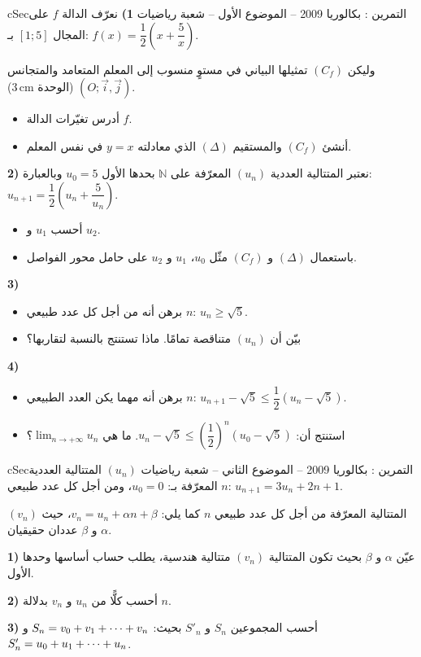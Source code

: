 \documentclass[12pt,a4paper]{article}
\newenvironment{BOX}[2]{\begin{otherlanguage}{english}\begin{arbox}{#1}{#2}}{\end{arbox}\end{otherlanguage}}
\newcounter{exo}
\newenvironment{tamrin}[1]{\stepcounter{exo}\begin{BOX}{cSec}{التمرين \theexo: #1}}{\end{BOX}}
\renewcommand{\cdots}{\mathinner{\cdotp\cdotp\cdotp}}
\newcommand{\N}{\mathbb{N}}
\newcommand{\limn}{\displaystyle\lim_{n\to+\infty}}
\newenvironment{sq}{\begin{itemize}[leftmargin=2.4em,itemsep=3pt]}{\end{itemize}}
\newcommand{\qa}{\item[(أ)]}\newcommand{\qb}{\item[(ب)]}\newcommand{\qc}{\item[(جـ)]}\newcommand{\qd}{\item[(د)]}\newcommand{\qe}{\item[(هـ)]}
\begin{document}
\begin{tamrin}{بكالوريا 2009 -- الموضوع الأول -- شعبة رياضيات}
\textbf{1)} نعرّف الدالة $f$ على المجال $[1;5]$ بـ: $f(x)=\dfrac{1}{2}\left(x+\dfrac{5}{x}\right)$.

وليكن $(C_f)$ تمثيلها البياني في مستوٍ منسوب إلى المعلم المتعامد والمتجانس $(O;\vec{i},\vec{j})$ (الوحدة $3\,\text{cm}$).
\begin{sq}
\qa أدرس تغيّرات الدالة $f$.
\qb أنشئ $(C_f)$ والمستقيم $(\Delta)$ الذي معادلته $y=x$ في نفس المعلم.
\end{sq}
\textbf{2)} نعتبر المتتالية العددية $(u_n)$ المعرّفة على $\N$ بحدها الأول $u_0=5$ وبالعبارة: $u_{n+1}=\dfrac{1}{2}\left(u_n+\dfrac{5}{u_n}\right)$.
\begin{sq}
\qa أحسب $u_1$ و $u_2$.
\qb باستعمال $(\Delta)$ و $(C_f)$ مثّل $u_0$، $u_1$ و $u_2$ على حامل محور الفواصل.
\end{sq}
\textbf{3)}
\begin{sq}
\qa برهن أنه من أجل كل عدد طبيعي $n$: $u_n\geqslant\sqrt5$.
\qb بيّن أن $(u_n)$ متناقصة تمامًا. ماذا تستنتج بالنسبة لتقاربها؟
\end{sq}
\textbf{4)}
\begin{sq}
\qa برهن أنه مهما يكن العدد الطبيعي $n$: $u_{n+1}-\sqrt5\leqslant\dfrac{1}{2}\left(u_n-\sqrt5\right)$.
\qb استنتج أن: $u_n-\sqrt5\leqslant\left(\dfrac{1}{2}\right)^{n}\left(u_0-\sqrt5\right)$. ما هي $\limn u_n$؟
\end{sq}
\end{tamrin}

\begin{tamrin}{بكالوريا 2009 -- الموضوع الثاني -- شعبة رياضيات}
$(u_n)$ المتتالية العددية المعرّفة بـ: $u_0=0$، ومن أجل كل عدد طبيعي $n$: $u_{n+1}=3u_n+2n+1$.

$(v_n)$ المتتالية المعرّفة من أجل كل عدد طبيعي $n$ كما يلي: $v_n=u_n+\alpha n+\beta$، حيث $\alpha$ و $\beta$ عددان حقيقيان.

\textbf{1)} عيّن $\alpha$ و $\beta$ بحيث تكون المتتالية $(v_n)$ متتالية هندسية، يطلب حساب أساسها وحدها الأول.

\textbf{2)} أحسب كلًّا من $u_n$ و $v_n$ بدلالة $n$.

\textbf{3)} أحسب المجموعين $S_n$ و $S'_n$ بحيث: $S_n=v_0+v_1+\cdots+v_n$ و $S'_n=u_0+u_1+\cdots+u_n$.
\end{tamrin}
\end{document}
